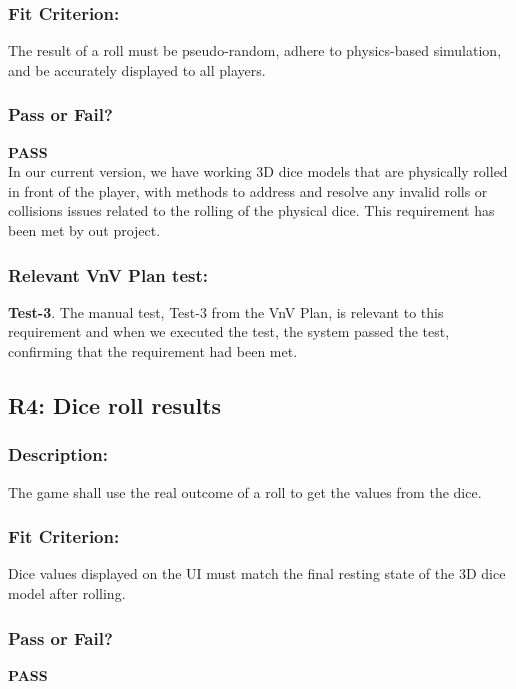 \documentclass[12pt, titlepage]{article}
\begin{document}
\subsubsection{Fit Criterion:} The result of a roll must be pseudo-random, adhere to physics-based simulation, and be accurately displayed to all players.

\subsubsection{Pass or Fail?} 

 \noindent \textbf{PASS}\\
 
 \noindent In our current version, we have working 3D dice models that are physically rolled in front of the player, with methods to address and resolve any invalid rolls or collisions issues related to the rolling of the physical dice.  This requirement has been met by out project.

 \subsubsection{Relevant VnV Plan test: }  \textbf{ Test-3}. The manual test, Test-3 from the VnV Plan, is relevant to this requirement and when we executed the test, the system passed the test, confirming that the requirement had been met.
 
\subsection{R4: Dice roll results} 

\subsubsection{Description:}The game shall use the real outcome of a roll to get the values from the dice.
  
\subsubsection{Fit Criterion:} Dice values displayed on the UI must match the final resting state of the 3D dice model after rolling.

\subsubsection{Pass or Fail?} 
 
  \noindent \textbf{PASS}\\
 
\end{document}
